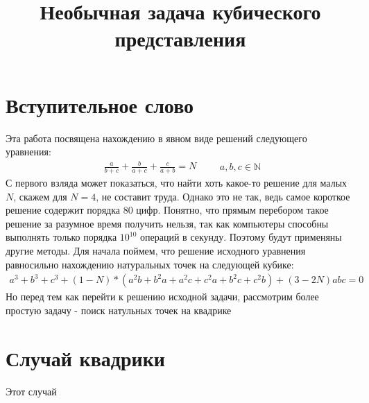 \title{Необычная задача кубического представления}  
\date{}  
\author{}

\maketitle  
\section*{Вступительное слово}
Эта работа посвящена  нахождению в явном виде решений следующего уравнения: \newline
\[
\begin{aligned}
\frac{a} {b + c}  + \frac{b}{a  + c} + \frac{c}{a+b} = N
\end{aligned} \qquad a, b, c \in \mathbb{N}
\] 
\newline
С первого взляда может показаться, что найти хоть какое-то решение для малых $N$, скажем для $N = 4$, не составит труда. Однако это не так, ведь самое короткое решение содержит порядка 80 цифр. Понятно, что прямым перебором такое решение за разумное время получить нельзя, так как компьютеры способны выполнять только порядка $10^{10}$ операций в секунду. Поэтому будут применяны другие методы.
Для начала поймем, что решение исходного уравнения равносильно нахождению натуральных точек на следующей кубике:
\newline
\[
\begin{aligned}
	a^3 + b^3 + c^3 + (1 - N) * (a^2b + b^2a + a^2c + c^2a + b^2c + c^2b) +(3 - 2N)abc = 0
\end{aligned} 
\] 
\newline
Но перед тем как перейти к решению исходной задачи, рассмотрим более простую задачу - поиск натульных точек на квадрике 

\section*{Случай квадрики}
Этот случай 
